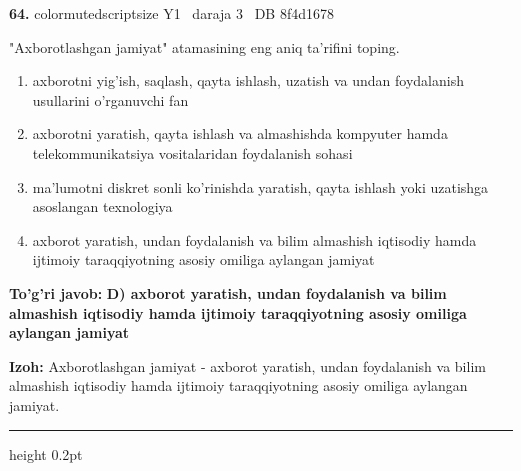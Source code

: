 \documentclass[10pt,a4paper,oneside]{article}
\begin{document}
\noindent\textbf{\color{ink}64.}  {color{muted}scriptsize Y1 \textbullet\ daraja 3 \textbullet\ DB 8f4d1678}
\par
"Axborotlashgan jamiyat" atamasining eng aniq ta'rifini toping.
\begin{enumerate}[label=\Alph*),leftmargin=9mm]
\item axborotni yig'ish, saqlash, qayta ishlash, uzatish va undan foydalanish usullarini o'rganuvchi fan
\item axborotni yaratish, qayta ishlash va almashishda kompyuter hamda telekommunikatsiya vositalaridan foydalanish sohasi
\item ma'lumotni diskret sonli ko'rinishda yaratish, qayta ishlash yoki uzatishga asoslangan texnologiya
\item axborot yaratish, undan foydalanish va bilim almashish iqtisodiy hamda ijtimoiy taraqqiyotning asosiy omiliga aylangan jamiyat
\end{enumerate}
\begin{tcolorbox}[enhanced,breakable,colback=teal!4,colframe=teal!50!black,boxrule=0.5pt,arc=1.1mm,left=3mm,right=3mm,top=1.7mm,bottom=1.7mm,before skip=2mm,after skip=2mm]
\textbf{\color{teal}To'g'ri javob:} \textbf{D) axborot yaratish, undan foydalanish va bilim almashish iqtisodiy hamda ijtimoiy taraqqiyotning asosiy omiliga aylangan jamiyat}
\par\smallskip
\textbf{Izoh:} Axborotlashgan jamiyat - axborot yaratish, undan foydalanish va bilim almashish iqtisodiy hamda ijtimoiy taraqqiyotning asosiy omiliga aylangan jamiyat.
\end{tcolorbox}
\vspace{2mm}\hrule height 0.2pt \vspace{3mm}
\end{document}
